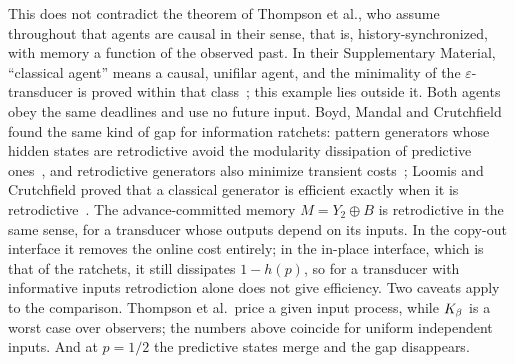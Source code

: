 This does not contradict the theorem of Thompson et al., who assume throughout that agents are causal in their sense, that is, history-synchronized, with memory a function of the observed past. In their Supplementary Material, ``classical agent'' means a causal, unifilar agent, and the minimality of the $\varepsilon$-transducer is proved within that class~\cite{Thompson25}; this example lies outside it. Both agents obey the same deadlines and use no future input. Boyd, Mandal and Crutchfield found the same kind of gap for information ratchets: pattern generators whose hidden states are retrodictive avoid the modularity dissipation of predictive ones~\cite{BMC18}, and retrodictive generators also minimize transient costs~\cite{BMRC17}; Loomis and Crutchfield proved that a classical generator is efficient exactly when it is retrodictive~\cite{LoomisCrutchfield20}. The advance-committed memory $M=Y_2\oplus B$ is retrodictive in the same sense, for a transducer whose outputs depend on its inputs. In the copy-out interface it removes the online cost entirely; in the in-place interface, which is that of the ratchets, it still dissipates $1-h(p)$, so for a transducer with informative inputs retrodiction alone does not give efficiency. Two caveats apply to the comparison. Thompson et al.\ price a given input process, while $K_\beta$ is a worst case over observers; the numbers above coincide for uniform independent inputs. And at $p=1/2$ the predictive states merge and the gap disappears.

